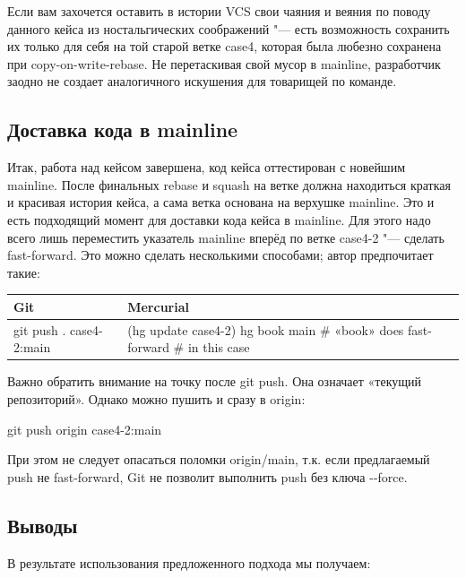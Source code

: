 \documentclass[10pt, a5paper]{article}
\begin{document}
Если вам захочется оставить в истории VCS свои чаяния и веяния по поводу данного кейса из ностальгических соображений "--- есть возможность сохранить их только для себя на той старой ветке case4, которая была любезно сохранена при copy-on-write-rebase. Не перетаскивая свой мусор в mainline, разработчик заодно не создает аналогичного искушения для товарищей по команде.

\subsection*{Доставка кода в mainline}

Итак, работа над кейсом завершена, код кейса оттестирован с новейшим mainline. После финальных rebase и squash на ветке должна находиться краткая и красивая история кейса, а сама ветка основана на верхушке mainline. Это и есть подходящий момент для доставки кода кейса в mainline. Для этого надо всего лишь переместить указатель mainline вперёд по ветке case4-2 "--- сделать fast-forward. Это можно сделать несколькими способами; автор предпочитает такие:

\begin{table}
  \centering
  \begin{tabular}{P{3.5cm}|P{6cm}} \hline
    \textbf{Git}                       & \textbf{Mercurial}            \\ \hline
     git push . case4-2:main      & (hg update case4-2) \linebreak
                               hg book main \linebreak  \# «book» does fast-forward \linebreak
                               \# in this case                                               \\ \hline
  \end{tabular}
\end{table}
Важно обратить внимание на точку после git push. Она означает «текущий репозиторий». Однако можно пушить и сразу в origin:

git push origin case4-2:main

При этом не следует опасаться поломки origin/main, т.к. если предлагаемый push не fast-forward, Git не позволит выполнить push без ключа -{}-force.

\subsection*{Выводы}

В результате использования предложенного подхода мы получаем:
\end{document}
